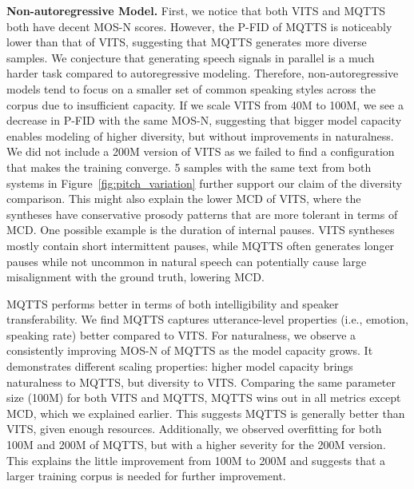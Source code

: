 \documentclass[letterpaper]{article}
\begin{document}
\textbf{Non-autoregressive Model.}
First, we notice that both VITS and MQTTS both have decent MOS-N scores.
However, the P-FID of MQTTS is noticeably lower than that of VITS, suggesting that MQTTS generates more diverse samples.
We conjecture that generating speech signals in parallel is a much harder task compared to autoregressive modeling.
Therefore, non-autoregressive models tend to focus on a smaller set of common speaking styles across the corpus due to insufficient capacity.
If we scale VITS from 40M to 100M, we see a decrease in P-FID with the same MOS-N, suggesting that bigger model capacity enables modeling of higher diversity, but without improvements in naturalness.
We did not include a 200M version of VITS as we failed to find a configuration that makes the training converge.
5 samples with the same text from both systems in Figure~\ref{fig:pitch_variation} further support our claim of the diversity comparison.
This might also explain the lower MCD of VITS, where the syntheses have conservative prosody patterns that are more tolerant in terms of MCD.
One possible example is the duration of internal pauses.
VITS syntheses mostly contain short intermittent pauses, while MQTTS often generates longer pauses while not uncommon in natural speech can potentially cause large misalignment with the ground truth, lowering MCD.

MQTTS performs better in terms of both intelligibility and speaker transferability.
We find MQTTS captures utterance-level properties (i.e., emotion, speaking rate) better compared to VITS.
For naturalness, we observe a consistently improving MOS-N of MQTTS as the model capacity grows.
It demonstrates different scaling properties: higher model capacity brings naturalness to MQTTS, but diversity to VITS.
Comparing the same parameter size (100M) for both VITS and MQTTS, MQTTS wins out in all metrics except MCD, which we explained earlier.
This suggests MQTTS is generally better than VITS, given enough resources.
Additionally, we observed overfitting for both 100M and 200M of MQTTS, but with a higher severity for the 200M version.
This explains the little improvement from 100M to 200M and suggests that a larger training corpus is needed for further improvement.
\end{document}

